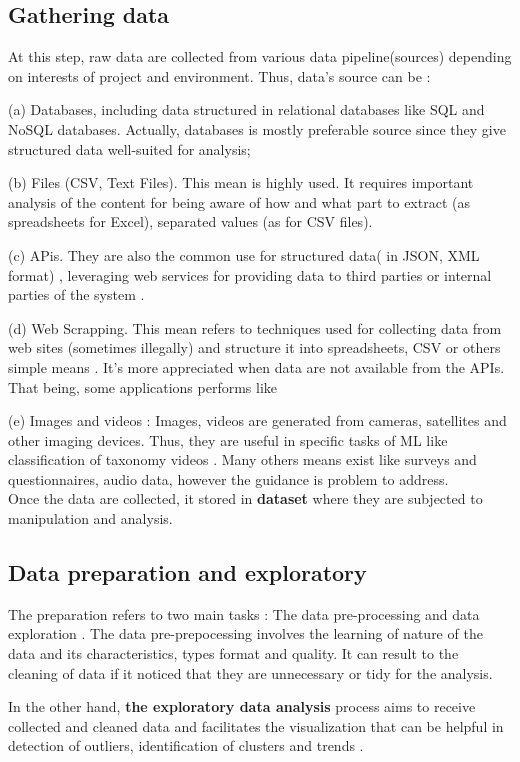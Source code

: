 \documentclass[12pt,a4paper]{report}
\begin{document}
\subsection{Gathering data}
At this step, raw data are collected from various data pipeline(sources) depending on interests of project and environment. Thus, data's source can be :  

(a) Databases, including data structured in relational databases like SQL and NoSQL databases. Actually, databases is mostly preferable source since they give structured data well-suited for analysis;

(b)  Files (CSV, Text Files). This mean is highly used. It requires important analysis of the content for being aware of how and what part to extract (as spreadsheets for Excel), separated values (as for CSV files).

(c) APis. They are also the common use for structured data( in JSON, XML format) , leveraging web services for providing data to third parties or internal parties of the system \cite{dataScienceMLeric}.

(d) Web Scrapping. This mean refers to techniques used for collecting data from web sites (sometimes illegally) and structure it into spreadsheets, CSV or others simple means \cite{sirisuriya2015comparative}. It's more appreciated when data are not available from the APIs. That being, some applications performs like 

(e) Images and videos : Images, videos are generated from cameras, satellites and other imaging devices. Thus, they are useful in specific tasks of ML like classification of taxonomy videos \cite{reviewVideo2020}. 
Many others means exist like surveys and questionnaires, audio data, however the guidance is problem to address. 
\\
Once the data are collected, it stored in \textbf{dataset} where they are subjected to manipulation and analysis.
\subsection{Data preparation and exploratory}
The preparation refers to two main tasks : The data pre-processing and data exploration . The data pre-prepocessing involves the learning of nature of the data and its characteristics, types format and quality. It can result to the cleaning of data if it noticed that they are unnecessary or tidy for the analysis.

In the other hand,\textbf{ the exploratory data analysis} process aims to receive collected and cleaned data and facilitates the visualization that can be helpful in detection of outliers, identification of clusters and trends \cite{unwin2020data}. 
\end{document}
